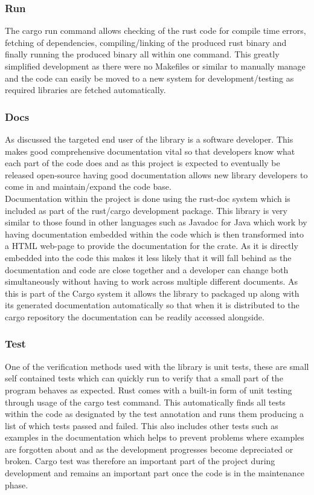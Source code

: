 \documentclass[11pt,a4paper]{article}
\begin{document}
\subsubsection{Run}
The cargo run command allows checking of the rust code for compile time errors, fetching of dependencies, compiling/linking of the produced rust binary and finally running the produced binary all within one command. This greatly simplified development as there were no Makefiles or similar to manually manage and the code can easily be moved to a new system for development/testing as required libraries are fetched automatically.

\subsubsection{Docs}
As discussed the targeted end user of the library is a software developer. This makes good comprehensive documentation vital so that developers know what each part of the code does and as this project is expected to eventually be released open-source having good documentation allows new library developers to come in and maintain/expand the code base.\\

Documentation within the project is done using the rust-doc system which is included as part of the rust/cargo development package. This library is very similar to those found in other languages such as Javadoc for Java which work by having documentation embedded within the code which is then transformed into a HTML web-page to provide the documentation for the crate. As it is directly embedded into the code this makes it less likely that it will fall behind as the documentation and code are close together and a developer can change both simultaneously without having to work across multiple different documents. As this is part of the Cargo system it allows the library to packaged up along with its generated documentation automatically so that when it is distributed to the cargo repository the documentation can be readily accessed alongside.

\subsubsection{Test}
One of the verification methods used with the library is unit tests, these are small self contained tests which can quickly run to verify that a small part of the program behaves as expected. Rust comes with a built-in form of unit testing through usage of the cargo test command. This automatically finds all tests within the code as designated by the test annotation and runs them producing a list of which tests passed and failed. This also includes other tests such as examples in the documentation which helps to prevent problems where examples are forgotten about and as the development progresses become depreciated or broken. Cargo test was therefore an important part of the project during development and remains an important part once the code is in the maintenance phase.
\end{document}
